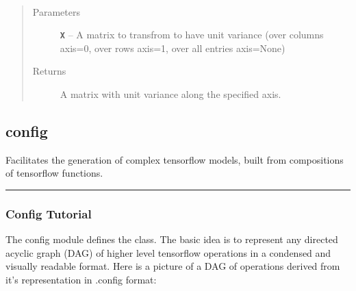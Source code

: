 \documentclass[letterpaper,10pt,english]{sphinxmanual}
\begin{document}

\begin{fulllineitems}
\label{loader:loader.unit_variance}~\begin{quote}\begin{description}
\item[{Parameters}] \leavevmode
\textbf{\texttt{X}} -- A matrix to transfrom to have unit variance (over columns axis=0, over rows axis=1, over all entries axis=None)

\item[{Returns}] \leavevmode
A matrix with unit variance along the specified axis.

\end{description}\end{quote}

\end{fulllineitems}


\begin{fulllineitems}
\label{loader:loader.untar}
\end{fulllineitems}



\subsection{config}
\label{config:config}\label{config::doc}\label{config:tensor-decompositions-and-applications}
Facilitates the generation of complex tensorflow models, built from
compositions of tensorflow functions.


\bigskip\hrule{}\bigskip



\subsubsection{Config Tutorial}
\label{config_tutorial:id7}\label{config_tutorial::doc}\label{config_tutorial:config-tutorial}
The config module defines the {\hyperref[config:config.AntGraph]{\emph{}}} class.
The basic idea is to represent any directed acyclic graph (DAG) of higher level tensorflow operations
in a condensed and visually readable format. Here is a picture of a DAG of operations
derived from it's representation in .config format:
\end{document}
